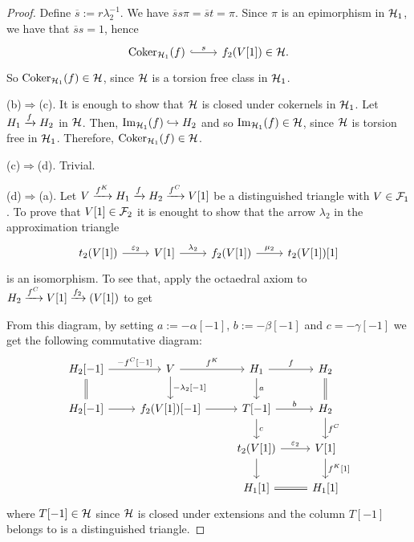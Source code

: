 \begin{proof}
  Define $\overline{s}:=r\lambda_2^{-1}$. We have $\overline{s}s\pi=\overline{s}t=\pi$. Since $\pi$ is an epimorphism in $\mathcal{H}_1$, we have that $\overline{s}s=1$, hence
  \begin{equation*}
    \begin{tikzcd}
      \Coker_{\clH_1}(f)\arrow[hook]{r}{s}
      & f_2(V[1])\in\clH.
    \end{tikzcd}
  \end{equation*}
  So $\operatorname{Coker}_{\mathcal{H}_1}(f)\in\mathcal{H}$, since $\mathcal{H}$ is a torsion free class in $\mathcal{H}_1$.

  \smallskip\noindent
  (b)$\Rightarrow$(c). It is enough to show that $\mathcal{H}$ is closed under cokernels in $\mathcal{H}_1$. Let $H_1\xrightarrow{f}H_2$ in $\mathcal{H}$. Then, $\operatorname{Im}_{\mathcal{H}_1}(f)\hookrightarrow H_2$ and so $\operatorname{Im}_{\mathcal{H}_1}(f)\in\mathcal{H}$, since $\mathcal{H}$ is torsion free in $\mathcal{H}_1$. Therefore, $\operatorname{Coker}_{\mathcal{H}_1}(f)\in\mathcal{H}$.

  \smallskip\noindent
  (c)$\Rightarrow$(d). Trivial.

  \smallskip\noindent
  (d)$\Rightarrow$(a). Let $V\xrightarrow{f^K}H_1\xrightarrow{f}H_2\xrightarrow{f^C}V[1]$ be a distinguished triangle with $V\in\mathcal{F}_1$. To prove that $V[1]\in\mathcal{F}_2$ it is enought to show that the arrow $\lambda_2$ in the approximation triangle
  \begin{equation*}
    \begin{tikzcd}
      t_2(V[1])\arrow{r}{\varepsilon_2}
      & V[1]\arrow{r}{\lambda_2}
        & f_2(V[1])\arrow{r}{\mu_2}
          & t_2(V[1])[1]
    \end{tikzcd}
  \end{equation*}
  is an isomorphism. To see that, apply the octaedral axiom to $H_2\xrightarrow{f^C}V[1]\xrightarrow{f_2}(V[1])$ to get

  

  From this diagram, by setting $a:= -\alpha[-1]$, $b:=-\beta[-1]$ and $c=-\gamma[-1]$ we get the following commutative diagram:
  \begin{equation*}
    \begin{tikzcd}
      H_2[-1]\arrow{r}{-f^C[-1]}\arrow[equal]{d}
      & V\arrow{r}{f^K}\arrow{d}{-\lambda_2[-1]}
        & H_1\arrow{r}{f}\arrow{d}{a}
          & H_2\arrow[equal]{d}\\
      H_2[-1]\arrow{r}
      & f_2(V[1])[-1]\arrow{r}
        & T[-1]\arrow{r}{b}\arrow{d}{c}
          & H_2\arrow{d}{f^C}\\
      & & t_2(V[1])\arrow{r}{\varepsilon_2}\arrow{d}
          & V[1]\arrow{d}{f^K[1]}\\
      & & H_1[1]\arrow[equal]{r}
          & H_1[1]
    \end{tikzcd}
  \end{equation*}
  where $T[-1]\in\mathcal{H}$ since $\mathcal{H}$ is closed under extensions and the column $T[-1]$ belongs to is a distinguished triangle.


\end{proof}
